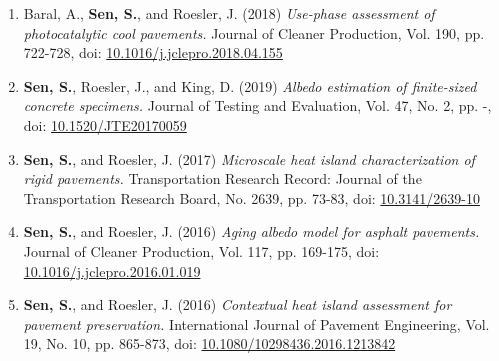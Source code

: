 \documentclass[12pt]{article}
\begin{document}
\begin{enumerate}
	\item Baral, A., \textbf{Sen, S.}, and Roesler, J. (2018) \textit{Use-phase assessment of photocatalytic cool pavements.}  Journal of Cleaner Production, Vol. 190, pp. 722-728, doi: \href{https://doi.org/10.1016/j.jclepro.2018.04.155}{10.1016/j.jclepro.2018.04.155}
	\item \textbf{Sen, S.}, Roesler, J., and King, D. (2019) \textit{Albedo estimation of finite-sized concrete specimens.} Journal of Testing and Evaluation, Vol. 47, No. 2, pp. -, doi: \href{https://doi.org/10.1520/JTE20170059}{10.1520/JTE20170059}
	\item \textbf{Sen, S.}, and Roesler, J. (2017) \textit{Microscale heat island characterization of rigid pavements.} Transportation Research Record: Journal of the Transportation Research Board, No. 2639, pp. 73-83, doi: \href{http://dx.doi.org/10.3141/2639-10}{10.3141/2639-10}
	\item \textbf{Sen, S.}, and Roesler, J. (2016) \textit{Aging albedo model for asphalt pavements.} Journal of Cleaner Production, Vol. 117, pp. 169-175, doi: \href{http://dx.doi.org/10.1016/j.jclepro.2016.01.019}{10.1016/j.jclepro.2016.01.019}
	\item \textbf{Sen, S.}, and Roesler, J. (2016) \textit{Contextual heat island assessment for pavement preservation.} International Journal of Pavement Engineering, Vol. 19, No. 10, pp. 865-873, doi: \href{https://www.tandfonline.com/doi/full/10.1080/10298436.2016.1213842}{10.1080/10298436.2016.1213842}
\end{enumerate} 

\hfill
\end{document}
